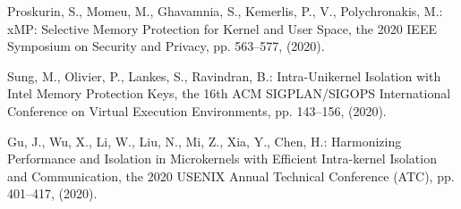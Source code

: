 \documentclass[paper]{ieice}
\begin{document}
\begin{thebibliography}{99}
  Proskurin, S., Momeu, M., Ghavamnia, S., Kemerlis, P., V., Polychronakis, M.: xMP: Selective Memory Protection for Kernel and User Space, the 2020 IEEE Symposium on Security and Privacy, pp. 563--577, (2020).

  Sung, M., Olivier, P., Lankes, S., Ravindran, B.: Intra-Unikernel Isolation with Intel Memory Protection Keys,
  the 16th ACM SIGPLAN/SIGOPS International Conference on Virtual Execution Environments, pp. 143--156, (2020).

  Gu, J., Wu, X., Li, W., Liu, N., Mi, Z., Xia, Y., Chen, H.: Harmonizing Performance and Isolation in Microkernels with Efficient Intra-kernel Isolation and Communication,
  the 2020 USENIX Annual Technical Conference (ATC), pp. 401--417, (2020).
  

\end{thebibliography}
\end{document}
